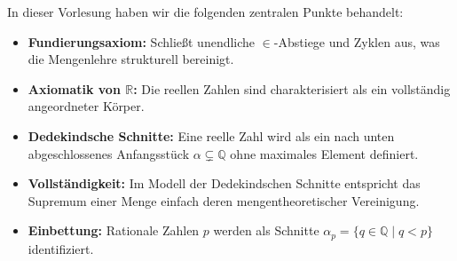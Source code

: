\begin{nice-box}
In dieser Vorlesung haben wir die folgenden zentralen Punkte behandelt:
\begin{itemize}
    \item \textbf{Fundierungsaxiom:} Schließt unendliche $\in$-Abstiege und Zyklen aus, was die Mengenlehre strukturell bereinigt.
    \item \textbf{Axiomatik von $\mathbb{R}$:} Die reellen Zahlen sind charakterisiert als ein vollständig angeordneter Körper.
    \item \textbf{Dedekindsche Schnitte:} Eine reelle Zahl wird als ein nach unten abgeschlossenes Anfangsstück $\alpha \subsetneq \mathbb{Q}$ ohne maximales Element definiert.
    \item \textbf{Vollständigkeit:} Im Modell der Dedekindschen Schnitte entspricht das Supremum einer Menge einfach deren mengentheoretischer Vereinigung.
    \item \textbf{Einbettung:} Rationale Zahlen $p$ werden als Schnitte $\alpha_p = \{q \in \mathbb{Q} \mid q < p\}$ identifiziert.
\end{itemize}
\end{nice-box}